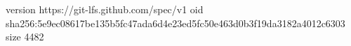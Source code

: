 version https://git-lfs.github.com/spec/v1
oid sha256:5e9ec08617be135b5fc47ada6d4e23ed5fc50e463d0b3f19da3182a4012c6303
size 4482
